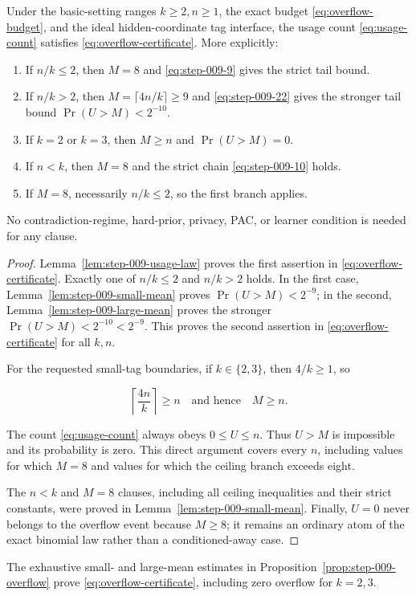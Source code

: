 \begin{proposition}\label{prop:step-009-overflow}
Under the basic-setting ranges \(k\ge2,n\ge1\), the exact budget \eqref{eq:overflow-budget}, and
the ideal hidden-coordinate tag interface, the usage count \eqref{eq:usage-count}
satisfies \eqref{eq:overflow-certificate}. More explicitly:

\begin{enumerate}
\item If \(n/k\le2\), then \(M=8\) and \eqref{eq:step-009-9} gives the strict tail bound.
\item If \(n/k>2\), then \(M=\lceil4n/k\rceil\ge9\) and \eqref{eq:step-009-22} gives the
stronger tail bound \(\Pr(U>M)<2^{-10}\).
\item If \(k=2\) or \(k=3\), then \(M\ge n\) and \(\Pr(U>M)=0\).
\item If \(n<k\), then \(M=8\) and the strict chain \eqref{eq:step-009-10} holds.
\item If \(M=8\), necessarily \(n/k\le2\), so the first branch applies.
\end{enumerate}

No contradiction-regime, hard-prior, privacy, PAC, or learner condition is
needed for any clause.
\end{proposition}

\begin{proof}
Lemma~\ref{lem:step-009-usage-law} proves the first assertion in \eqref{eq:overflow-certificate}.
Exactly one of \(n/k\le2\) and \(n/k>2\) holds. In the first case,
Lemma~\ref{lem:step-009-small-mean} proves
\(\Pr(U>M)<2^{-9}\); in the second,
Lemma~\ref{lem:step-009-large-mean} proves the stronger
\(\Pr(U>M)<2^{-10}<2^{-9}\). This proves the second assertion in \eqref{eq:overflow-certificate}
for all \(k,n\).

For the requested small-tag boundaries, if \(k\in\{2,3\}\), then
\(4/k\ge1\), so

\[
\left\lceil\frac{4n}{k}\right\rceil\ge n
\quad\text{and hence}\quad M\ge n.
\tag{S9.26}\label{eq:step-009-26}
\]

The count \eqref{eq:usage-count} always obeys \(0\le U\le n\). Thus \(U>M\) is impossible
and its probability is zero. This direct argument covers every \(n\),
including values for which \(M=8\) and values for which the ceiling branch
exceeds eight.

The \(n<k\) and \(M=8\) clauses, including all ceiling inequalities and
their strict constants, were proved in
Lemma~\ref{lem:step-009-small-mean}. Finally, \(U=0\) never belongs to the
overflow event because \(M\ge8\); it remains an ordinary atom of the exact
binomial law rather than a conditioned-away case. \end{proof}
The exhaustive small- and large-mean estimates in
Proposition~\ref{prop:step-009-overflow} prove
\eqref{eq:overflow-certificate}, including zero overflow for $k=2,3$.

